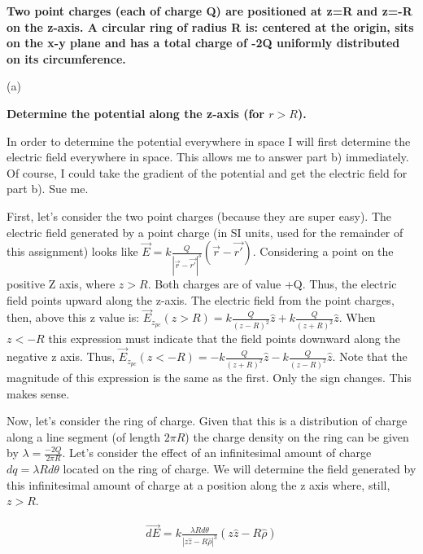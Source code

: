 \begin{homeworkProblem}

\textbf{Two point charges (each of charge Q) are positioned at z=R and z=-R on the z-axis. 
A circular ring of radius R is: centered at the origin, sits on the x-y plane and has a total 
charge of -2Q uniformly distributed on its circumference. }

\begin{homeworkSection}{(a)} 

\textbf{Determine the potential along the z-axis (for $r>R$).}

In order to determine the potential everywhere in space I will first determine the electric field everywhere in space. This allows me to answer part b) immediately. Of course, I could take the gradient of the potential and get the electric field for part b). Sue me.
\\ \par
First, let's consider the two point charges (because they are super easy). The electric field generated by a point charge (in SI units, used for the remainder of this assignment) looks like $\vec{E} = k \frac{Q}{|\vec{r}-\vec{r'}|^3}(\vec{r}-\vec{r'})$. Considering a point on the positive Z axis, where $z > R$. Both charges are of value +Q. Thus, the electric field points upward along the z-axis. The electric field from the point charges, then, above this z value is: $ \vec{E}_{z_{pc}}(z>R) = k \frac{Q}{(z-R)^2}\hat{z} + k \frac{Q}{(z+R)^2}\hat{z} $. When $z < -R$ this expression must indicate that the field points downward along the negative z axis. Thus, $\vec{E}_{z_{pc}}(z<-R) = -k \frac{Q}{(z+R)^2} \hat{z} - k \frac{Q}{(z-R)^2} \hat{z}$. Note that the magnitude of this expression is the same as the first. Only the sign changes. This makes sense.
\\ \par
Now, let's consider the ring of charge. Given that this is a distribution of charge along a line segment (of length $2\pi R$) the charge density on the ring can be given by $\lambda = \frac{-2Q}{2\pi R}$. Let's consider the effect of an infinitesimal amount of charge $dq = \lambda R d\theta$ located on the ring of charge. We will determine the field generated by this infinitesimal amount of charge at a position along the z axis where, still, $z > R$.
\\ \par
\begin{align}
\vec{dE} = k \frac{\lambda R d\theta}{|z\hat{z}-R\hat{\rho}|^3}(z\hat{z} - R\hat{\rho}) \nonumber \\

\end{align}
\end{homeworkSection}
\end{homeworkProblem}
